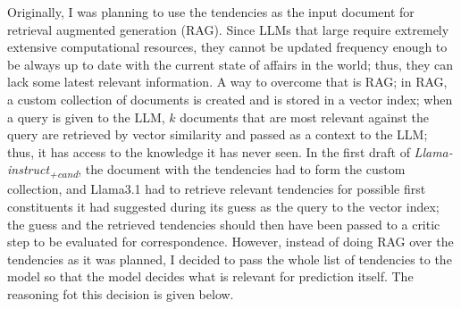 \documentclass[11pt]{article}
\begin{document}
Originally, I was planning to use the tendencies as the input document for retrieval augmented generation (RAG). Since LLMs that large require extremely extensive computational resources, they cannot be updated frequency enough to be always up to date with the current state of affairs in the world; thus, they can lack some latest relevant information. A way to overcome that is RAG; in RAG, a custom collection of documents is created and is stored in a vector index; when a query is given to the LLM, $k$ documents that are most relevant against the query are retrieved by vector similarity and passed as a context to the LLM; thus, it has access to the knowledge it has never seen. In the first draft of \textit{Llama-instruct\textsubscript{+cand}}, the document with the tendencies had to form the custom collection, and Llama3.1 had to retrieve relevant tendencies for possible first constituents it had suggested during its guess as the query to the vector index; the guess and the retrieved tendencies should then have been passed to a critic step to be evaluated for correspondence. However, instead of doing RAG over the tendencies as it was planned, I decided to pass the whole list of tendencies to the model so that the model decides what is relevant for prediction itself. The reasoning fot this decision is given below.
\end{document}
